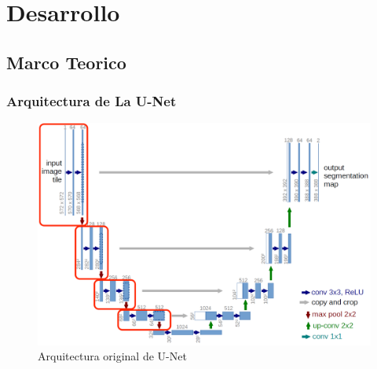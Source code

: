 \chapter{Desarrollo}
\label{chap:desarrollo}
\section{Marco Teorico}
\label{Sec:Marco Teorico Desarrollo}

\subsection{Arquitectura de La U-Net}
\begin{figure}[H]
	\centering
		\includegraphics[width=1\textwidth]{06changedetection/unet.png} 
	\caption{Arquitectura original de U-Net}
	\label{fig:ArquitecturaUNET}
\end{figure}

